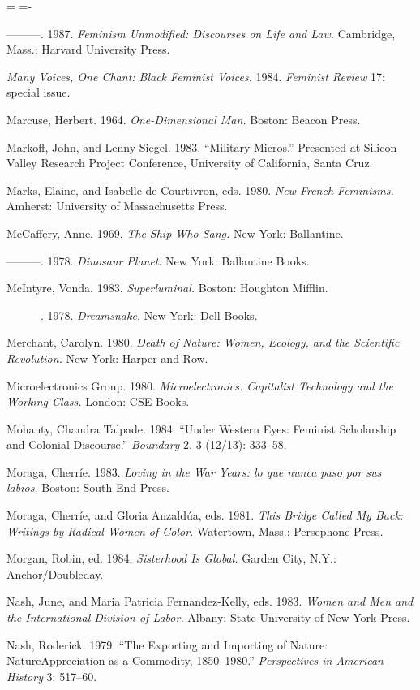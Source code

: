 \documentclass[DIV=12,%
               BCOR=10mm,%
               headinclude=false,%
               footinclude=false,open=any,%
               fontsize=11pt,%
               twoside,%
               paper=210mm:11in]%
               {scrbook}
\newenvironment*{amusebiblio}{
  \leftskip=\parindent
  \parindent=-\parindent
  \smallskip
  \indent
}{\smallskip}
\newcommand*{\Slash}{\slash\hspace{0pt}}
\begin{document}
\begin{amusebiblio}
———. 1987. \emph{Feminism Unmodified: Discourses on Life and Law.} Cambridge, Mass.: Harvard University Press.


\emph{Many Voices, One Chant: Black Feminist Voices.} 1984. \emph{Feminist Review} 17: special issue.


Marcuse, Herbert. 1964. \emph{One-Dimensional Man.} Boston: Beacon Press.


Markoff, John, and Lenny Siegel. 1983. “Military Micros.” Presented at Silicon Valley Research Project Conference, University of California, Santa Cruz.


Marks, Elaine, and Isabelle de Courtivron, eds. 1980. \emph{New French Feminisms.} Amherst: University of Massachusetts Press.


McCaffery, Anne. 1969. \emph{The Ship Who Sang.} New York: Ballantine.


———. 1978. \emph{Dinosaur Planet}. New York: Ballantine Books.


McIntyre, Vonda. 1983. \emph{Superluminal.} Boston: Houghton Mifflin.


———. 1978. \emph{Dreamsnake.} New York: Dell Books.


Merchant, Carolyn. 1980. \emph{Death of Nature: Women, Ecology, and the Scientific Revolution.} New York: Harper and Row.


Microelectronics Group. 1980. \emph{Microelectronics: Capitalist Technology and the Working Class.} London: CSE Books.


Mohanty, Chandra Talpade. 1984. “Under Western Eyes: Feminist Scholarship and Colonial Discourse.” \emph{Boundary} 2, 3 (12\Slash{}13): 333–58.


Moraga, Cherríe. 1983. \emph{Loving in the War Years: lo que nunca paso por sus labios.} Boston: South End Press.


Moraga, Cherríe, and Gloria Anzaldúa, eds. 1981. \emph{This Bridge Called My Back: Writings by Radical Women of Color.} Watertown, Mass.: Persephone Press\emph{.}


Morgan, Robin, ed. 1984. \emph{Sisterhood Is Global.} Garden City, N.Y.: Anchor\Slash{}Doubleday.


Nash, June, and Maria Patricia Fernandez-Kelly, eds. 1983. \emph{Women and Men and the International Division of Labor.} Albany: State University of New York Press.


Nash, Roderick. 1979. “The Exporting and Importing of Nature: NatureAppreciation as a Commodity, 1850–1980.” \emph{Perspectives in American History} 3: 517–60.



\end{amusebiblio}
\end{document}
